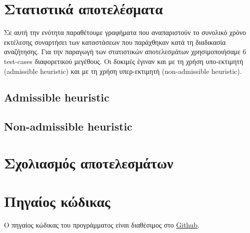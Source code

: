\documentclass[12pt]{article}
\begin{document}
\section{Στατιστικά αποτελέσματα}
Σε αυτή την ενότητα παραθέτουμε γραφήματα που αναπαριστούν το συνολικό χρόνο εκτέλεσης συναρτήσει των καταστάσεων που παράχθηκαν κατά τη διαδικασία αναζήτησης. Για την παραγωγή των στατιστικών αποτελεσμάτων χρησιμοποιήσαμε 6 test-cases διαφορετικού μεγέθους. Οι δοκιμές έγιναν και με τη χρήση υπο-εκτιμητή (admissible heuristic) και με τη χρήση υπερ-εκτιμητή  (non-admissible heuristic).
\subsection{Admissible heuristic}
\subsection{Non-admissible heuristic}
\section{Σχολιασμός αποτελεσμάτων}
\section{Πηγαίος κώδικας}
Ο πηγαίος κώδικας του προγράμματος είναι διαθέσιμος στο \href{https://github.com/zoep/ECC-OCaml}{Github}.
\end{document}
